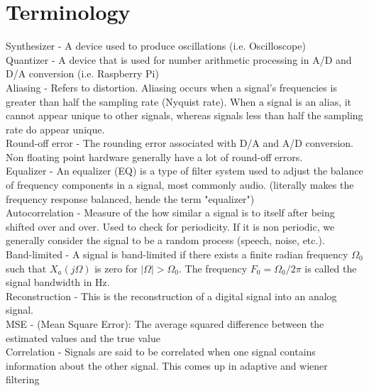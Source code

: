\documentclass{article}
\begin{document}
\section{Terminology}
Synthesizer - A device used to produce oscillations (i.e. Oscilloscope) \\
\vspace{1em}
Quantizer - A device that is used for number arithmetic processing in A/D and D/A conversion (i.e. Raspberry Pi) \\
\vspace{1em}
Aliasing - Refers to distortion. Aliasing occurs when a signal's frequencies is greater than half the sampling rate (Nyquist rate). When a signal is an alias, it cannot appear unique to other signals, whereas signals less than half the sampling rate do appear unique. \\
\vspace{1em}
Round-off error - The rounding error associated with D/A and A/D conversion. Non floating point hardware generally have a lot of round-off errors. \\
\vspace{1em}
Equalizer - An equalizer (EQ) is a type of filter system used to adjust the balance of frequency components in a signal, most commonly audio. (literally makes the frequency response balanced, hende the term "equalizer") \\
\vspace{1em}
Autocorrelation - Measure of the how similar a signal is to itself after being shifted over and over. Used to check for periodicity. If it is non periodic, we generally consider the signal to be a random process (speech, noise, etc.). \\
\vspace{1em}
Band-limited - A signal is band-limited if there exists a finite radian frequency $\Omega_0$ such that $X_a(j\Omega)$ is zero for $|\Omega| > \Omega_0$. The frequency $F_0 = \Omega_0/2\pi$ is
called the signal bandwidth in Hz. \\
\vspace{1em}
Reconstruction - This is the reconstruction of a digital signal into an analog signal. \\
\vspace{1em}
MSE -  (Mean Square Error): The average squared difference between the estimated values and the true value \\
\vspace{1em}
Correlation - Signals are said to be correlated when one signal contains information about the other signal. This comes up in adaptive and wiener filtering \\
\end{document}
